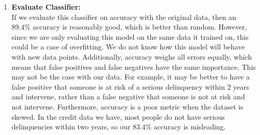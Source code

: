 \documentclass[letterpaper,12pt]{article}
\begin{document}
\begin{enumerate}
\item \textbf{Evaluate Classifier:} \\
If we evaluate this classifier on accuracy with the original data, then an $89.4\%$ accuracy is reasonably good, which is better than random. However, since we are only evaluating this model on the same data it trained on, this could be a case of overfitting. We do not know how this model will behave with new data points. Additionally, accuracy weighs all errors equally, which means that false positives and false negatives have the same importance. This may not be the case with our data. For example, it may be better to have a false positive that someone is at risk of a serious delinquency within 2 years and intervene, rather than a false negative that someone is not at risk and not intervene. Furthermore, accuracy is a poor metric when the dataset is skewed. In the credit data we have, most people do not have serious delinquencies within two years, so our $83.4 \%$ accuracy is misleading. 
\end{enumerate}
\end{document}
